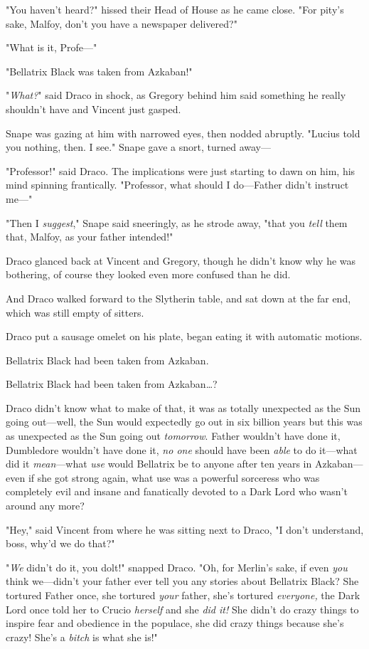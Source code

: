 "You haven't heard?" hissed their Head of House as he came close. "For pity's
sake, Malfoy, don't you have a newspaper delivered?"

"What is it, Profe—"

"Bellatrix Black was taken from Azkaban!"

"\emph{What?}" said Draco in shock, as Gregory behind him said something he
really shouldn't have and Vincent just gasped.

Snape was gazing at him with narrowed eyes, then nodded abruptly. "Lucius told
you nothing, then. I see." Snape gave a snort, turned away—

"Professor!" said Draco. The implications were just starting to dawn on him,
his mind spinning frantically. "Professor, what should I do—Father didn't
instruct me—"

"Then I \emph{suggest}," Snape said sneeringly, as he strode away, "that you
\emph{tell} them that, Malfoy, as your father intended!"

Draco glanced back at Vincent and Gregory, though he didn't know why he was
bothering, of course they looked even more confused than he did.

And Draco walked forward to the Slytherin table, and sat down at the far end,
which was still empty of sitters.

Draco put a sausage omelet on his plate, began eating it with automatic motions.

Bellatrix Black had been taken from Azkaban.

Bellatrix Black had been taken from Azkaban…?

Draco didn't know what to make of that, it was as totally unexpected as the Sun
going out—well, the Sun would expectedly go out in six billion years but this
was as unexpected as the Sun going out \emph{tomorrow}. Father wouldn't have
done it, Dumbledore wouldn't have done it, \emph{no one} should have been
\emph{able} to do it—what did it \emph{mean}—what \emph{use} would
Bellatrix be to anyone after ten years in Azkaban—even if she got strong
again, what use was a powerful sorceress who was completely evil and insane and
fanatically devoted to a Dark Lord who wasn't around any more?

"Hey," said Vincent from where he was sitting next to Draco, "I don't
understand, boss, why'd we do that?"

"\emph{We} didn't do it, you dolt!" snapped Draco. "Oh, for Merlin's sake, if
even \emph{you} think we—didn't your father ever tell you any stories about
Bellatrix Black? She tortured Father once, she tortured \emph{your} father,
she's tortured \emph{everyone,} the Dark Lord once told her to Crucio
\emph{herself} and she \emph{did it!} She didn't do crazy things to inspire
fear and obedience in the populace, she did crazy things because she's crazy!
She's a \emph{bitch} is what she is!"

